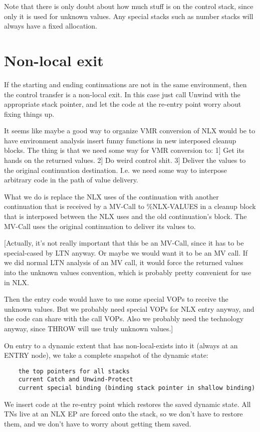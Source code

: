 Note that there is only doubt about how much stuff is on the control stack,
since only it is used for unknown values.  Any special stacks such as number
stacks will always have a fixed allocation.


\section{Non-local exit}


If the starting and ending continuations are not in the same environment, then
the control transfer is a non-local exit.  In this case just call Unwind with
the appropriate stack pointer, and let the code at the re-entry point worry
about fixing things up.

It seems like maybe a good way to organize VMR conversion of NLX would be to
have environment analysis insert funny functions in new interposed cleanup
blocks.  The thing is that we need some way for VMR conversion to:
 1] Get its hands on the returned values.
 2] Do weird control shit.
 3] Deliver the values to the original continuation destination.
I.e. we need some way to interpose arbitrary code in the path of value
delivery.

What we do is replace the NLX uses of the continuation with another
continuation that is received by a MV-Call to \%NLX-VALUES in a cleanup block
that is interposed between the NLX uses and the old continuation's block.  The
MV-Call uses the original continuation to deliver its values to.  

[Actually, it's not really important that this be an MV-Call, since it has to
be special-cased by LTN anyway.  Or maybe we would want it to be an MV call.
If we did normal LTN analysis of an MV call, it would force the returned values
into the unknown values convention, which is probably pretty convenient for use
in NLX.

Then the entry code would have to use some special VOPs to receive the unknown
values.  But we probably need special VOPs for NLX entry anyway, and the code
can share with the call VOPs.  Also we probably need the technology anyway,
since THROW will use truly unknown values.]


On entry to a dynamic extent that has non-local-exists into it (always at an
ENTRY node), we take a complete snapshot of the dynamic state:
\begin{verbatim}
    the top pointers for all stacks
    current Catch and Unwind-Protect
    current special binding (binding stack pointer in shallow binding)
\end{verbatim}

We insert code at the re-entry point which restores the saved dynamic state.
All TNs live at an NLX EP are forced onto the stack, so we don't have to restore
them, and we don't have to worry about getting them saved.

